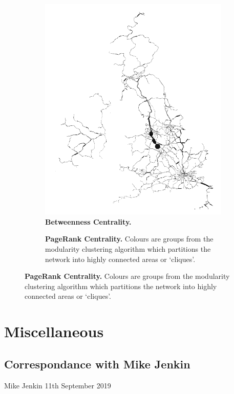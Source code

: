 \begin{figure}[H]
\begin{subfigure}[b]{.49\textwidth}
     \centering
         \includegraphics[width=\textwidth]{rail/betweenness.png}
        \caption{ \textbf{Betweenness Centrality.}}
\end{subfigure}
\begin{subfigure}[b]{.49\textwidth}
     \centering
        \caption{ \textbf{PageRank Centrality.} Colours are groups from the modularity clustering algorithm which partitions the network into highly connected areas or `cliques'.}
\end{subfigure}
\end{figure}




\chapter{Miscellaneous}




\section{Correspondance with Mike Jenkin}\label{appendix:correspondance}
Mike Jenkin 11th September 2019


